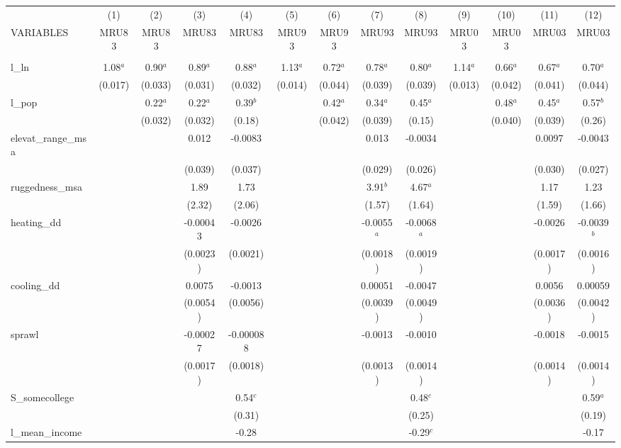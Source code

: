\documentclass[]{article}
\begin{document}
\begin{tabular}{lcccccccccccc} \hline
 & (1) & (2) & (3) & (4) & (5) & (6) & (7) & (8) & (9) & (10) & (11) & (12) \\
VARIABLES & MRU83 & MRU83 & MRU83 & MRU83 & MRU93 & MRU93 & MRU93 & MRU93 & MRU03 & MRU03 & MRU03 & MRU03 \\ \hline
 &  &  &  &  &  &  &  &  &  &  &  &  \\
l\_ln & 1.08$^a$ & 0.90$^a$ & 0.89$^a$ & 0.88$^a$ & 1.13$^a$ & 0.72$^a$ & 0.78$^a$ & 0.80$^a$ & 1.14$^a$ & 0.66$^a$ & 0.67$^a$ & 0.70$^a$ \\
 & (0.017) & (0.033) & (0.031) & (0.032) & (0.014) & (0.044) & (0.039) & (0.039) & (0.013) & (0.042) & (0.041) & (0.044) \\
l\_pop &  & 0.22$^a$ & 0.22$^a$ & 0.39$^b$ &  & 0.42$^a$ & 0.34$^a$ & 0.45$^a$ &  & 0.48$^a$ & 0.45$^a$ & 0.57$^b$ \\
 &  & (0.032) & (0.032) & (0.18) &  & (0.042) & (0.039) & (0.15) &  & (0.040) & (0.039) & (0.26) \\
elevat\_range\_msa &  &  & 0.012 & -0.0083 &  &  & 0.013 & -0.0034 &  &  & 0.0097 & -0.0043 \\
 &  &  & (0.039) & (0.037) &  &  & (0.029) & (0.026) &  &  & (0.030) & (0.027) \\
ruggedness\_msa &  &  & 1.89 & 1.73 &  &  & 3.91$^b$ & 4.67$^a$ &  &  & 1.17 & 1.23 \\
 &  &  & (2.32) & (2.06) &  &  & (1.57) & (1.64) &  &  & (1.59) & (1.66) \\
heating\_dd &  &  & -0.00043 & -0.0026 &  &  & -0.0055$^a$ & -0.0068$^a$ &  &  & -0.0026 & -0.0039$^b$ \\
 &  &  & (0.0023) & (0.0021) &  &  & (0.0018) & (0.0019) &  &  & (0.0017) & (0.0016) \\
cooling\_dd &  &  & 0.0075 & -0.0013 &  &  & 0.00051 & -0.0047 &  &  & 0.0056 & 0.00059 \\
 &  &  & (0.0054) & (0.0056) &  &  & (0.0039) & (0.0049) &  &  & (0.0036) & (0.0042) \\
sprawl &  &  & -0.00027 & -0.000088 &  &  & -0.0013 & -0.0010 &  &  & -0.0018 & -0.0015 \\
 &  &  & (0.0017) & (0.0018) &  &  & (0.0013) & (0.0014) &  &  & (0.0014) & (0.0014) \\
S\_somecollege &  &  &  & 0.54$^c$ &  &  &  & 0.48$^c$ &  &  &  & 0.59$^a$ \\
 &  &  &  & (0.31) &  &  &  & (0.25) &  &  &  & (0.19) \\
l\_mean\_income &  &  &  & -0.28 &  &  &  & -0.29$^c$ &  &  &  & -0.17 \\

\end{tabular}
\end{document}
